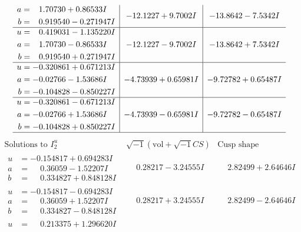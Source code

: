\documentclass[1p]{elsarticle_modified}
\theoremstyle{definition}
\newcommand{\I}{\sqrt{-1}}
\begin{document}
$$\begin{array}{c|c|c}
\begin{aligned}
a &= \phantom{-}1.70730 + 0.86533 I \\
b &= \phantom{-}0.919540 - 0.271947 I\end{aligned}
 & -12.1227 + 9.7002 I & -13.8642 - 7.5342 I \\ \hline\begin{aligned}
u &= \phantom{-}0.419031 - 1.135220 I \\
a &= \phantom{-}1.70730 - 0.86533 I \\
b &= \phantom{-}0.919540 + 0.271947 I\end{aligned}
 & -12.1227 - 9.7002 I & -13.8642 + 7.5342 I \\ \hline\begin{aligned}
u &= -0.320861 + 0.671213 I \\
a &= -0.02766 - 1.53686 I \\
b &= -0.104828 - 0.850227 I\end{aligned}
 & -4.73939 + 0.65981 I & -9.72782 + 0.65487 I \\ \hline\begin{aligned}
u &= -0.320861 - 0.671213 I \\
a &= -0.02766 + 1.53686 I \\
b &= -0.104828 + 0.850227 I\end{aligned}
 & -4.73939 - 0.65981 I & -9.72782 - 0.65487 I\\
 \hline 
 \end{array}$$\newpage$$\begin{array}{c|c|c}  
\text{Solutions to }I^u_{2}& \I (\text{vol} + \sqrt{-1}CS) & \text{Cusp shape}\\
 \hline 
\begin{aligned}
u &= -0.154817 + 0.694283 I \\
a &= \phantom{-}0.36059 - 1.52207 I \\
b &= \phantom{-}0.334827 + 0.848128 I\end{aligned}
 & \phantom{-}0.28217 - 3.24555 I & \phantom{-}2.82499 + 2.64646 I \\ \hline\begin{aligned}
u &= -0.154817 - 0.694283 I \\
a &= \phantom{-}0.36059 + 1.52207 I \\
b &= \phantom{-}0.334827 - 0.848128 I\end{aligned}
 & \phantom{-}0.28217 + 3.24555 I & \phantom{-}2.82499 - 2.64646 I \\ \hline\begin{aligned}
u &= \phantom{-}0.213375 + 1.296620 I \\

\end{aligned}
\end{array}$$
\end{document}
